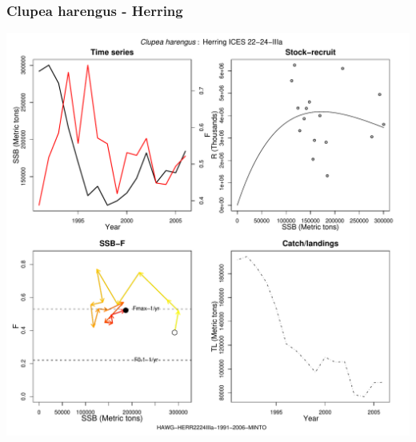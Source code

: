 \subsubsection{Clupea harengus - Herring}
\begin{center}
\includegraphics[width=1.2\textwidth]{../R/figures/HAWG-HERR2224IIIa-1991-2006-MINTO.pdf}
\end{center}

